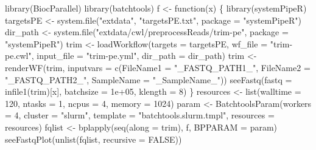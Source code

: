 \documentclass[14pt,]{article}
\newcommand{\hlnum}[1]{\textcolor[rgb]{0.816,0.125,0.439}{#1}}%
\newcommand{\hlstr}[1]{\textcolor[rgb]{0.251,0.627,0.251}{#1}}%
\newcommand{\hlstd}[1]{\textcolor[rgb]{0.251,0.251,0.251}{#1}}%
\newcommand{\hlkwc}[1]{\textcolor[rgb]{0.251,0.251,0.251}{#1}}%
\newcommand{\hlkwd}[1]{\textcolor[rgb]{0.878,0.439,0.125}{#1}}%
\newenvironment{Shaded}{\begin{myshaded}}{\end{myshaded}}
\newcommand{\KeywordTok}[1]{\hlkwd{#1}}
\newcommand{\DataTypeTok}[1]{\hlkwc{#1}}
\newcommand{\DecValTok}[1]{\hlnum{#1}}
\newcommand{\FloatTok}[1]{\hlnum{#1}}
\newcommand{\StringTok}[1]{\hlstr{#1}}
\newcommand{\OtherTok}[1]{{#1}}
\newcommand{\ControlFlowTok}[1]{\hlkwd{#1}}
\newcommand{\NormalTok}[1]{\hlstd{#1}}
\begin{document}
\begin{Shaded}
\begin{Highlighting}[]
\KeywordTok{library}\NormalTok{(BiocParallel)}
\KeywordTok{library}\NormalTok{(batchtools)}
\NormalTok{f <-}\StringTok{ }\ControlFlowTok{function}\NormalTok{(x) \{}
    \KeywordTok{library}\NormalTok{(systemPipeR)}
\NormalTok{    targetsPE <-}\StringTok{ }\KeywordTok{system.file}\NormalTok{(}\StringTok{"extdata"}\NormalTok{, }\StringTok{"targetsPE.txt"}\NormalTok{, }\DataTypeTok{package =} \StringTok{"systemPipeR"}\NormalTok{)}
\NormalTok{    dir_path <-}\StringTok{ }\KeywordTok{system.file}\NormalTok{(}\StringTok{"extdata/cwl/preprocessReads/trim-pe"}\NormalTok{, }\DataTypeTok{package =} \StringTok{"systemPipeR"}\NormalTok{)}
\NormalTok{    trim <-}\StringTok{ }\KeywordTok{loadWorkflow}\NormalTok{(}\DataTypeTok{targets =}\NormalTok{ targetsPE, }\DataTypeTok{wf_file =} \StringTok{"trim-pe.cwl"}\NormalTok{, }\DataTypeTok{input_file =} \StringTok{"trim-pe.yml"}\NormalTok{, }
        \DataTypeTok{dir_path =}\NormalTok{ dir_path)}
\NormalTok{    trim <-}\StringTok{ }\KeywordTok{renderWF}\NormalTok{(trim, }\DataTypeTok{inputvars =} \KeywordTok{c}\NormalTok{(}\DataTypeTok{FileName1 =} \StringTok{"_FASTQ_PATH1_"}\NormalTok{, }\DataTypeTok{FileName2 =} \StringTok{"_FASTQ_PATH2_"}\NormalTok{, }
        \DataTypeTok{SampleName =} \StringTok{"_SampleName_"}\NormalTok{))}
    \KeywordTok{seeFastq}\NormalTok{(}\DataTypeTok{fastq =} \KeywordTok{infile1}\NormalTok{(trim)[x], }\DataTypeTok{batchsize =} \FloatTok{1e+05}\NormalTok{, }\DataTypeTok{klength =} \DecValTok{8}\NormalTok{)}
\NormalTok{\}}
\NormalTok{resources <-}\StringTok{ }\KeywordTok{list}\NormalTok{(}\DataTypeTok{walltime =} \DecValTok{120}\NormalTok{, }\DataTypeTok{ntasks =} \DecValTok{1}\NormalTok{, }\DataTypeTok{ncpus =} \DecValTok{4}\NormalTok{, }\DataTypeTok{memory =} \DecValTok{1024}\NormalTok{)}
\NormalTok{param <-}\StringTok{ }\KeywordTok{BatchtoolsParam}\NormalTok{(}\DataTypeTok{workers =} \DecValTok{4}\NormalTok{, }\DataTypeTok{cluster =} \StringTok{"slurm"}\NormalTok{, }\DataTypeTok{template =} \StringTok{"batchtools.slurm.tmpl"}\NormalTok{, }
    \DataTypeTok{resources =}\NormalTok{ resources)}
\NormalTok{fqlist <-}\StringTok{ }\KeywordTok{bplapply}\NormalTok{(}\KeywordTok{seq}\NormalTok{(}\DataTypeTok{along =}\NormalTok{ trim), f, }\DataTypeTok{BPPARAM =}\NormalTok{ param)}
\KeywordTok{seeFastqPlot}\NormalTok{(}\KeywordTok{unlist}\NormalTok{(fqlist, }\DataTypeTok{recursive =} \OtherTok{FALSE}\NormalTok{))}
\end{Highlighting}
\end{Shaded}
\end{document}
